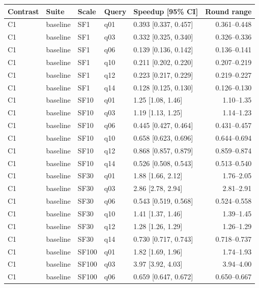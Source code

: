 \begin{longtable}{lllllr}
\toprule
Contrast & Suite & Scale & Query & Speedup [95\% CI] & Round range \\
\midrule
\endhead
\bottomrule
\endfoot
C1 & baseline & SF1 & q01 & 0.393 [0.337, 0.457] & 0.361--0.448 \\
C1 & baseline & SF1 & q03 & 0.332 [0.325, 0.340] & 0.326--0.336 \\
C1 & baseline & SF1 & q06 & 0.139 [0.136, 0.142] & 0.136--0.141 \\
C1 & baseline & SF1 & q10 & 0.211 [0.202, 0.220] & 0.207--0.219 \\
C1 & baseline & SF1 & q12 & 0.223 [0.217, 0.229] & 0.219--0.227 \\
C1 & baseline & SF1 & q14 & 0.128 [0.125, 0.130] & 0.126--0.130 \\
C1 & baseline & SF10 & q01 & 1.25 [1.08, 1.46] & 1.10--1.35 \\
C1 & baseline & SF10 & q03 & 1.19 [1.13, 1.25] & 1.14--1.23 \\
C1 & baseline & SF10 & q06 & 0.445 [0.427, 0.464] & 0.431--0.457 \\
C1 & baseline & SF10 & q10 & 0.658 [0.623, 0.696] & 0.644--0.694 \\
C1 & baseline & SF10 & q12 & 0.868 [0.857, 0.879] & 0.859--0.874 \\
C1 & baseline & SF10 & q14 & 0.526 [0.508, 0.543] & 0.513--0.540 \\
C1 & baseline & SF30 & q01 & 1.88 [1.66, 2.12] & 1.76--2.05 \\
C1 & baseline & SF30 & q03 & 2.86 [2.78, 2.94] & 2.81--2.91 \\
C1 & baseline & SF30 & q06 & 0.543 [0.519, 0.568] & 0.524--0.558 \\
C1 & baseline & SF30 & q10 & 1.41 [1.37, 1.46] & 1.39--1.45 \\
C1 & baseline & SF30 & q12 & 1.28 [1.26, 1.29] & 1.26--1.29 \\
C1 & baseline & SF30 & q14 & 0.730 [0.717, 0.743] & 0.718--0.737 \\
C1 & baseline & SF100 & q01 & 1.82 [1.69, 1.96] & 1.74--1.93 \\
C1 & baseline & SF100 & q03 & 3.97 [3.92, 4.03] & 3.94--4.00 \\
C1 & baseline & SF100 & q06 & 0.659 [0.647, 0.672] & 0.650--0.667 \\

\end{longtable}
